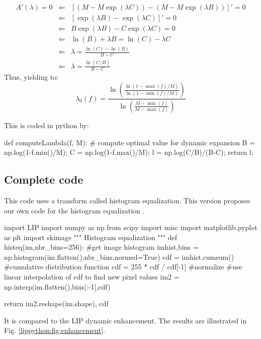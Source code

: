 \begin{eqnarray*}
A'(\lambda)=0&\Leftarrow &[(M-M\exp(\lambda C))-(M-M\exp(\lambda B))]'=0\\
&\Leftarrow & [\exp(\lambda B)-\exp(\lambda C)]'=0\\
&\Leftarrow & B\exp(\lambda B)-C\exp(\lambda C)=0\\
&\Leftarrow & \ln(B)+\lambda B=\ln(C) -\lambda C\\
&\Leftarrow & \lambda=\frac{\ln(C)-\ln(B)}{B-C}\\
&\Leftarrow & \lambda=\frac{\ln(C/B)}{B-C}
\end{eqnarray*}
Thus, yielding to:
$$\lambda_0(f)=\frac{\displaystyle\ln\left(\frac{\ln(1-\max(f)/M)}{\ln(1-\min(f)/M)}\right)}{\displaystyle\ln\left(\frac{M-\min(f)}{M-\max(f)}\right)}$$

This is coded in python by:

\begin{python}
def computeLambda(f, M):
    # compute optimal value for dynamic expansion
    B = np.log(1-f.min()/M);
    C = np.log(1-f.max()/M);
    l = np.log(C/B)/(B-C);
    return l;
\end{python}

\vspace*{-.5\baselineskip}

\subsection{Complete code}
This code uses a transform called histogram equalization. This version proposes our own code for the histogram equalization .
\begin{python}
import LIP
import numpy as np
from scipy import misc
import matplotlib.pyplot as plt
import skimage
""" Histogram equalization
"""
def histeq(im,nbr_bins=256):
   #get image histogram
   imhist,bins = np.histogram(im.flatten(),nbr_bins,normed=True)
   cdf = imhist.cumsum() #cumulative distribution function
   cdf = 255 * cdf / cdf[-1] #normalize
   #use linear interpolation of cdf to find new pixel values
   im2 = np.interp(im.flatten(),bins[:-1],cdf)

   return im2.reshape(im.shape), cdf
\end{python}

It is compared to the LIP dynamic enhancement. The results are illustrated in Fig. \ref{lippython:fig:enhancement}.

